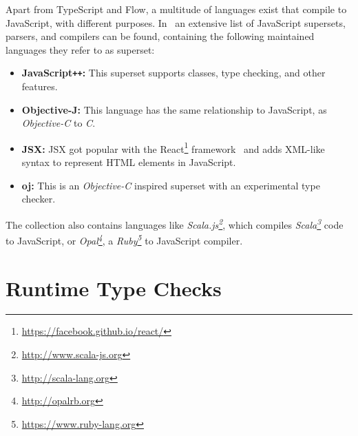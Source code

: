 Apart from TypeScript and Flow, a multitude of languages exist that compile to JavaScript, with different purposes. In~\cite{LanguagesThatCompileToJS:CoffeeScript} an extensive list of JavaScript supersets, parsers, and compilers can be found, containing the following maintained languages they refer to as superset:
\begin{itemize}
  \item \textbf{JavaScript\texttt{++}:} This superset supports classes, type checking, and other features.
  \item \textbf{Objective-J:} This language has the same relationship to JavaScript, as \emph{Objective-C} to \emph{C}.
  \item \textbf{JSX:} JSX got popular with the React\footnote{\url{https://facebook.github.io/react/}} framework~\cite{TypeScriptHandbook:JSX} and adds XML-like syntax to represent HTML elements in JavaScript.
  \item \textbf{oj:} This is an \emph{Objective-C} inspired superset with an experimental type checker.
\end{itemize}
The collection also contains languages like \emph{Scala.js\footnote{\url{http://www.scala-js.org}}}, which compiles \emph{Scala\footnote{\url{http://scala-lang.org}}} code to JavaScript, or \emph{Opal\footnote{\url{http://opalrb.org}}}, a \emph{Ruby\footnote{\url{https://www.ruby-lang.org}}} to JavaScript compiler.

\section{Runtime Type Checks}
\label{sec:runtime-type-checks}


